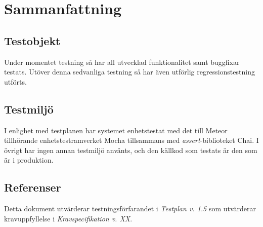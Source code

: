 \section{Sammanfattning}

\subsection{Testobjekt}
Under momentet testning så har all utvecklad funktionalitet samt buggfixar testats. Utöver denna sedvanliga testning så har även utförlig regressionstestning utförts.
\subsection{Testmiljö}
I enlighet med testplanen har systemet enhetstestat med det till Meteor tillhörande enhetstestramverket Mocha tillsammans med \textit{assert}-biblioteket Chai. I övrigt har ingen annan testmiljö använts, och den källkod som testats är den som är i produktion.
\subsection{Referenser}
Detta dokument utvärderar testningsförfarandet i \textit{Testplan v. 1.5} som utvärderar kravuppfyllelse i \textit{Kravspecifikation v. XX}. 

